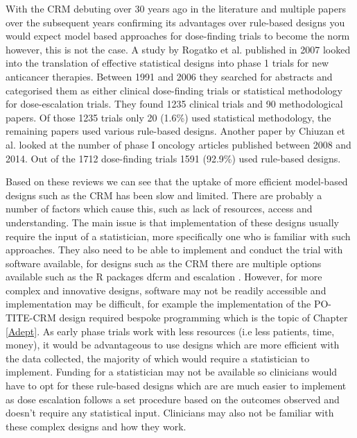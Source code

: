 With the CRM debuting over 30 years ago in the literature and multiple papers over the subsequent years confirming its advantages over rule-based designs you would expect model based approaches for dose-finding trials to become the norm however, this is not the case. A study by Rogatko et al. \cite{rogatkoTranslationInnovativeDesigns2007} published in 2007 looked into the translation of effective statistical designs into phase 1 trials for new anticancer therapies. Between 1991 and 2006 they searched for abstracts and categorised them as either clinical dose-finding trials or statistical methodology for dose-escalation trials. They found 1235 clinical trials and 90 methodological papers. Of those 1235 trials only 20 (1.6\%) used statistical methodology, the remaining papers used various rule-based designs. Another paper by Chiuzan et al. \cite{chiuzanDosefindingDesignsTrials2017} looked at the number of phase \RN{1} oncology articles published between 2008 and 2014. Out of the 1712 dose-finding trials 1591 (92.9\%) used rule-based designs. 

Based on these reviews we can see that the uptake of more efficient model-based designs such as the CRM has been slow and limited. There are probably a number of factors which cause this, such as lack of resources, access and understanding. The main issue is that implementation of these designs usually require the input of a statistician, more specifically one who is familiar with such approaches. They also need to be able to implement and conduct the trial with software available, for designs such as the CRM there are multiple options available such as the R packages dfcrm \cite{cheungDfcrmDoseFindingContinual2019} and escalation \cite{brockModularApproachDose2020}. However, for more complex and innovative designs, software may not be readily accessible and implementation may be difficult, for example the implementation of the PO-TITE-CRM design required bespoke programming which is the topic of Chapter \ref{Adept}. As early phase trials work with less resources (i.e less patients, time, money), it would be advantageous to use designs which are more efficient with the data collected, the majority of which would require a statistician to implement. Funding for a statistician may not be available so clinicians would have to opt for these rule-based designs which are are much easier to implement as dose escalation follows a set procedure based on the outcomes observed and doesn't require any statistical input. Clinicians may also not be familiar with these complex designs and how they work. 